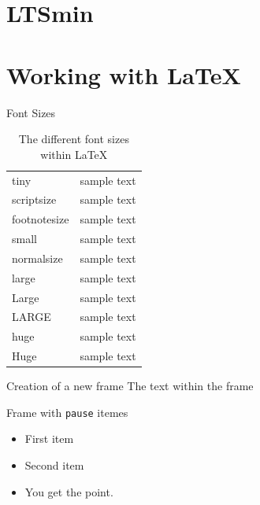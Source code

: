 \section{LTSmin}

\section{Working with \LaTeX}
\begin{frame}{Font Sizes}
  \begin{table}[htdp]
\caption{The different font sizes within \LaTeX}
\begin{center}
\begin{tabular}{| l c |} \hline
 tiny			& {\tiny sample text}\\
 scriptsize		& {\scriptsize sample text}\\
 footnotesize	& {\footnotesize sample text}\\
 small		& {\small sample text}\\
 normalsize	& {\normalsize sample text}\\
 large		& {\large sample text}\\
 Large 		& {\Large sample text}\\
 LARGE 		& {\LARGE sample text}\\
 huge 		& {\huge sample text}\\
 Huge		& {\Huge sample text} \\\hline

\end{tabular}
\end{center}
\label{default}
\end{table}%
\end{frame}

\begin{frame}{Creation of a new frame}
The text within the frame
\end{frame}


% 
	
\begin{frame}{Frame with \texttt{pause} itemes}
	\begin{itemize} 
		\item First item \pause
		\item Second item \pause
		\item You get the point. 
	\end{itemize} 
\end{frame}


